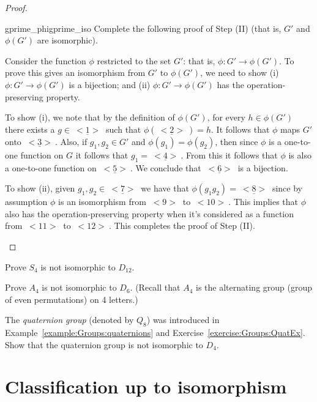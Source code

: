\begin{proof}
\begin{exercise}{gprime_phigprime_iso}
Complete the following proof of Step (II) (that is, $G'$ and $\phi(G')$ are isomorphic). 
\medskip

Consider the function $\phi$ restricted to the set $G'$: that is, $\phi: G' \rightarrow \phi(G')$.  To  prove this gives an isomorphism from $G'$ to $\phi(G')$, we need to show (i) $\phi: G' \rightarrow \phi(G')$ is a bijection; and (ii) $\phi: G' \rightarrow \phi(G')$ has the operation-preserving property.

To show (i), we note that by the definition of $\phi(G')$, for every $h \in \phi(G')$ there exists a $g \in \underline{~<1>~}$ such that $\phi(\underline{~<2>~}) = h$. It follows that $\phi$ maps $G'$ onto $\underline{~<3>~}$.  Also, if $g_1, g_2 \in G'$ and $\phi(g_1) = \phi(g_2)$, then since $\phi$ is a one-to-one function on $G$ it follows that $g_1 = \underline{~<4>~}$. From this it follows that $\phi$ is also a one-to-one function on $\underline{~<5>~}$.  We conclude that $\underline{~<6>~}$ is a bijection.

To show (ii), given $g_1, g_2 \in \underline{~<7>~}$ we have that $\phi(g_1 g_2) = \underline{~<8>~}$ since by assumption $\phi$ is an isomorphism from \underline{$~<9>~$} to \underline{$~<10>~$}. This implies that $\phi$ also has the operation-preserving  property when it's considered as a function from  \underline{$~<11>~$} to \underline{$~<12>~$}.  This completes the proof of Step (II).
 \end{exercise}

\end{proof}

\begin{exercise}{}
Prove $S_4$ is not isomorphic to $D_{12}$. 
\end{exercise}

\begin{exercise}{}
Prove $A_4$ is not isomorphic to $D_{6}$. (Recall that $A_4$ is the alternating group (group of even permutations) on 4 letters.) 
\end{exercise}

\begin{exercise}{}
The \emph{quaternion group} (denoted by $Q_8$) was introduced in Example~\ref{example:Groups:quaternions} and Exercise~\ref{exercise:Groups:QuatEx}. Show that the quaternion group is not isomorphic to $D_4$.
\end{exercise}

\section{Classification up to isomorphism}
\label{sec:Isomorphism:Classification}

